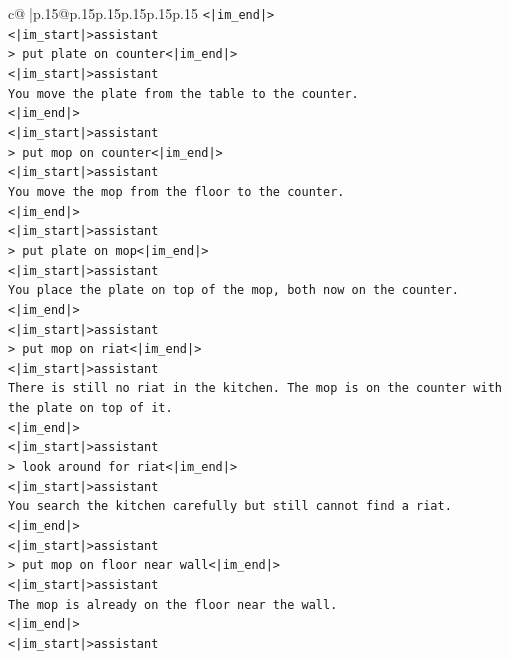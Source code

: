 \documentclass{article}
\begin{document}
{\begin{supertabular}{c@{$\;$}|p{.15\linewidth}@{}p{.15\linewidth}p{.15\linewidth}p{.15\linewidth}p{.15\linewidth}p{.15\linewidth}}
{{{\texttt{<|im\_end|>} \\
\texttt{<|im\_start|>assistant} \\
\texttt{> put plate on counter<|im\_end|>} \\
\texttt{<|im\_start|>assistant} \\
\texttt{You move the plate from the table to the counter.} \\
\texttt{<|im\_end|>} \\
\texttt{<|im\_start|>assistant} \\
\texttt{> put mop on counter<|im\_end|>} \\
\texttt{<|im\_start|>assistant} \\
\texttt{You move the mop from the floor to the counter.} \\
\texttt{<|im\_end|>} \\
\texttt{<|im\_start|>assistant} \\
\texttt{> put plate on mop<|im\_end|>} \\
\texttt{<|im\_start|>assistant} \\
\texttt{You place the plate on top of the mop, both now on the counter.} \\
\texttt{<|im\_end|>} \\
\texttt{<|im\_start|>assistant} \\
\texttt{> put mop on riat<|im\_end|>} \\
\texttt{<|im\_start|>assistant} \\
\texttt{There is still no riat in the kitchen. The mop is on the counter with the plate on top of it.} \\
\texttt{<|im\_end|>} \\
\texttt{<|im\_start|>assistant} \\
\texttt{> look around for riat<|im\_end|>} \\
\texttt{<|im\_start|>assistant} \\
\texttt{You search the kitchen carefully but still cannot find a riat.} \\
\texttt{<|im\_end|>} \\
\texttt{<|im\_start|>assistant} \\
\texttt{> put mop on floor near wall<|im\_end|>} \\
\texttt{<|im\_start|>assistant} \\
\texttt{The mop is already on the floor near the wall.} \\
\texttt{<|im\_end|>} \\
\texttt{<|im\_start|>assistant} \\
}}}
\end{supertabular}}
\end{document}
